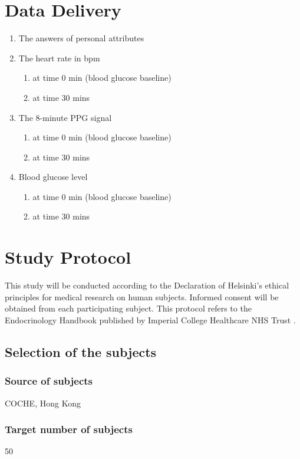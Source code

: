 \documentclass{article}
\begin{document}
\section{Data Delivery}
\begin{enumerate}
\item The answers of personal attributes
\item The heart rate in bpm
    \begin{enumerate}
        \item at time 0 min (blood glucose baseline)
        \item at time 30 mins
    \end{enumerate}
\item The 8-minute PPG signal
    \begin{enumerate}
        \item at time 0 min (blood glucose baseline)
        \item at time 30 mins
    \end{enumerate}
\item Blood glucose level
    \begin{enumerate}
        \item at time 0 min (blood glucose baseline)
        \item at time 30 mins
    \end{enumerate}
\end{enumerate}

\section{Study Protocol}
This study will be conducted according to the Declaration of Helsinki's ethical principles for medical research on human subjects.
Informed consent will be obtained from each participating subject. This protocol refers to the Endocrinology Handbook published
by Imperial College Healthcare NHS Trust \cite{ali_endocrinology_2018}.

\subsection{Selection of the subjects}
\subsubsection{Source of subjects}
COCHE, Hong Kong
\subsubsection{Target number of subjects}
50
\end{document}

